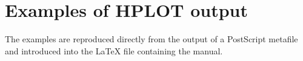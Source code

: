 
\chapter{Examples of HPLOT output}
The examples are reproduced directly from the output of a PostScript metafile
and introduced into the \LaTeX{} file containing the \HPLOT{} manual.

